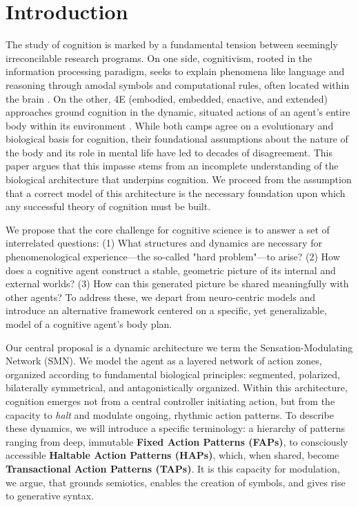 \section{Introduction}
\label{sec:introduction}
The study of cognition is marked by a fundamental tension between seemingly irreconcilable research programs. On one side, cognitivism, rooted in the information processing paradigm, seeks to explain phenomena like language and reasoning through amodal symbols and computational rules, often located within the brain \cite{chomsky1965aspects, fodor_modularity_1983}. On the other, 4E (embodied, embedded, enactive, and extended) approaches ground cognition in the dynamic, situated actions of an agent's entire body within its environment \cite{varela1991embodied,  maturana1991autopoiesis, noe_action_2004}. While both camps agree on a evolutionary and biological basis for cognition, their foundational assumptions about the nature of the body and its role in mental life have led to decades of disagreement. This paper argues that this impasse stems from an incomplete understanding of the biological architecture that underpins cognition. We proceed from the assumption that a correct model of this architecture is the necessary foundation upon which any successful theory of cognition must be built.

We propose that the core challenge for cognitive science is to answer a set of interrelated questions: (1) What structures and dynamics are necessary for phenomenological experience—the so-called "hard problem"—to arise? (2) How does a cognitive agent construct a stable, geometric picture of its internal and external worlds? (3) How can this generated picture be shared meaningfully with other agents? To address these, we depart from neuro-centric models and introduce an alternative framework centered on a specific, yet generalizable, model of a cognitive agent's body plan.

Our central proposal is a dynamic architecture we term the Sensation-Modulating Network (SMN). We model the agent as a layered network of action zones, organized according to fundamental biological principles: segmented, polarized, bilaterally symmetrical, and antagonistically organized. Within this architecture, cognition emerges not from a central controller initiating action, but from the capacity to \textit{halt} and modulate ongoing, rhythmic action patterns. To describe these dynamics, we will introduce a specific terminology: a hierarchy of patterns ranging from deep, immutable \textbf{Fixed Action Patterns (FAPs)}, to consciously accessible \textbf{Haltable Action Patterns (HAPs)}, which, when shared, become \textbf{Transactional Action Patterns (TAPs)}. It is this capacity for modulation, we argue, that grounds semiotics\cite{peirce1992essential}, enables the creation of symbols, and gives rise to generative syntax\cite{chomsky1965aspects}.

